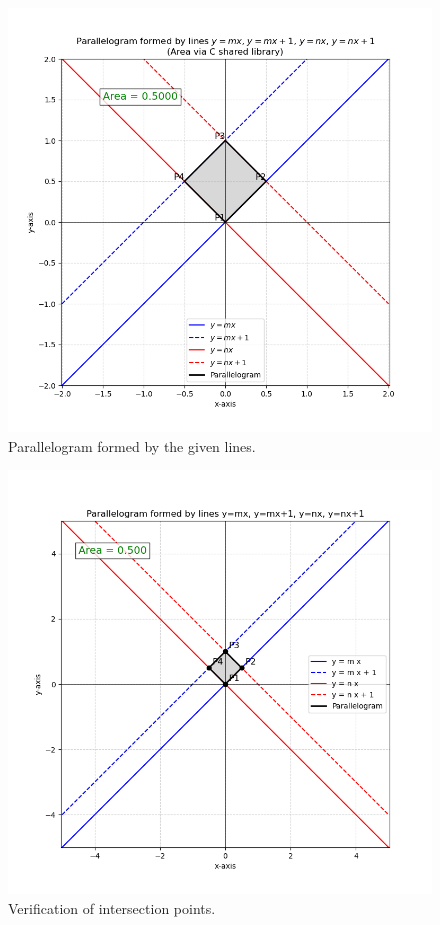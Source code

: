 \documentclass[journal]{IEEEtran}
\begin{document}
\begin{figure}[h!]
    \centering
    \includegraphics[width=0.9\columnwidth]{figs/Figure_81.png}
    \caption{Parallelogram formed by the given lines.}
\end{figure}

\begin{figure}[h!]
    \centering
    \includegraphics[width=0.9\columnwidth]{figs/fig82.png}
    \caption{Verification of intersection points.}
\end{figure}
\end{document}
